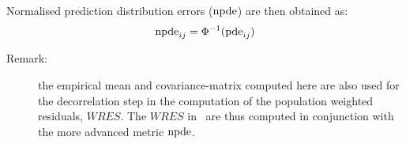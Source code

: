 Normalised prediction distribution errors (${\rm npde}$) are then obtained as:
\begin{equation}
{\rm npde}_{ij} = \Phi^{-1} ({\rm pde}_{ij})
\end{equation}

\begin{description}
\item[Remark:] the empirical mean and covariance-matrix computed here are also used for the decorrelation step in the computation of the population weighted residuals, $WRES$. The $WRES$ in \saemix ~are thus computed in conjunction with the more advanced metric ${\rm npde}$.
\end{description}

